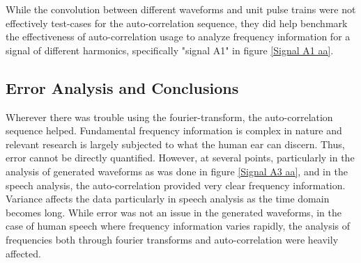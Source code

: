 \documentclass[12pt]{article}
\begin{document}
While the convolution between different waveforms and unit pulse trains were not effectively test-cases for the auto-correlation sequence, they did help benchmark the effectiveness of auto-correlation usage to analyze frequency information for a signal of different harmonics, specifically "signal A1" in figure \ref{Signal A1 aa}.

\subsection{Error Analysis and Conclusions}

Wherever there was trouble using the fourier-transform, the auto-correlation sequence helped. Fundamental frequency information is  complex in nature and relevant research is largely subjected to what the human ear can discern\citep{aa}. Thus, error cannot be directly quantified. However, at several points, particularly in the analysis of generated waveforms as was done in figure \ref{Signal A3 aa}, and in the speech analysis, the auto-correlation provided very clear frequency information. Variance affects the data particularly in speech analysis as the time domain becomes long. While error was not an issue in the generated waveforms, in the case of human speech where frequency information varies rapidly, the analysis of frequencies both through fourier transforms and auto-correlation were heavily affected.


\medskip

\end{document}

